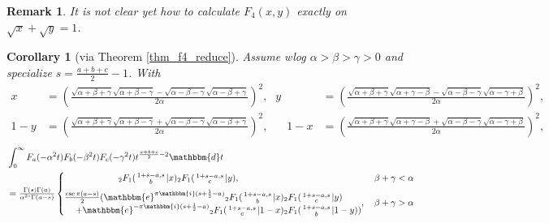 \documentclass[12pt]{article}
\newcommand{\ee}[0] {\mathbbm{e}}
\newcommand{\ii}[0] {\mathbbm{i}}
\newcommand{\dd}[0] {\mathbbm{d}}
\numberwithin{equation}{section}
\newtheorem{remark}[theorem]{Remark}
\newtheorem{corollary}[theorem]{Corollary}
\newcommand{\Head}[3] {{}_{#1}{#2}_{#3}}
\newcommand{\ArgS}[3] {( \begin{smallmatrix} #1 \\ #2 \end{smallmatrix} | {#3})}
\newcommand{\HypJ}[2] {F_{#1}(#2)}
\begin{document}
\begin{remark}
It is not clear yet how to calculate $F_4(x,y)$ exactly on $\sqrt{x} + \sqrt{y} = 1$.
\end{remark}
\begin{corollary}[via Theorem \ref{thm_f4_reduce}]
Assume wlog $\alpha > \beta > \gamma > 0$ and specialize $s=\frac{a+b+c}{2}-1$. With
\begin{equation*}
\begin{alignedat}{7}
x &= (\tfrac{\sqrt{\alpha +\beta +\gamma }\sqrt{\alpha +\beta -\gamma }-\sqrt{\alpha -\beta -\gamma } \sqrt{\alpha
   -\beta +\gamma }}{2 \alpha })^2\text{,}& y &= (\tfrac{\sqrt{\alpha +\beta +\gamma }\sqrt{\alpha +\gamma-\beta }-\sqrt{\alpha -\beta -\gamma } \sqrt{\alpha-\gamma +\beta }}{2 \alpha })^2\text{,}\\
1-y &= (\tfrac{\sqrt{\alpha +\beta +\gamma }\sqrt{\alpha +\beta -\gamma }+\sqrt{\alpha -\beta -\gamma } \sqrt{\alpha
   -\beta +\gamma }}{2 \alpha })^2\text{,}& \quad 1-x &= (\tfrac{\sqrt{\alpha +\beta +\gamma }\sqrt{\alpha +\gamma-\beta }+\sqrt{\alpha -\beta -\gamma } \sqrt{\alpha-\gamma +\beta }}{2 \alpha })^2\text{,}
\end{alignedat}
\end{equation*}
\begin{align*}
&\int_{0}^{\infty} \HypJ{a}{-\alpha^2 t} \HypJ{b}{-\beta^2 t} \HypJ{c}{-\gamma^2 t} t^{\frac{a+b+c}{2}-2} \dd t\\
&=\tfrac{\Gamma(s) \Gamma (a)}{\alpha^{2s} \Gamma(a-s)} \begin{cases}
\quad \quad \quad \quad \quad \quad  \Head{2}{F}{1} \ArgS{1+s-a,s}{b}{x} \Head{2}{F}{1} \ArgS{1+s-a,s}{c}{y}\text{,} \, &\beta + \gamma < \alpha\\
\vspace{-8pt}\\
\begin{aligned}
\tfrac{\csc \pi (a-s)}{2} (\ee^{\pi \ii (s+\frac12-a)} \Head2F1 \ArgS{1+s-a,s}{b}{x} & \Head{2}{F}{1} \ArgS{1+s-a,s}{c}{y}\\
\quad + \ee^{-\pi \ii (s+\frac12-a)} \Head2F1 \ArgS{1+s-a,s}{c}{1-x} & \Head2F1 \ArgS{1+s-a,s}{b}{1-y})
\end{aligned}
\text{,} \, &\beta + \gamma > \alpha\\
\end{cases}
\end{align*}
\end{corollary}
\end{document}
